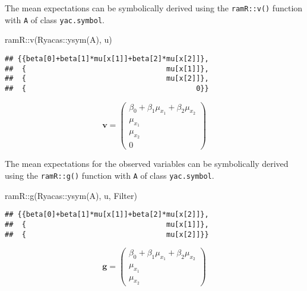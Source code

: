 \documentclass[
]{book}
\newenvironment{Shaded}{\begin{snugshade}}{\end{snugshade}}
\newcommand{\FunctionTok}[1]{\textcolor[rgb]{0.00,0.00,0.00}{#1}}
\newcommand{\NormalTok}[1]{#1}
\newcommand{\SpecialCharTok}[1]{\textcolor[rgb]{0.00,0.00,0.00}{#1}}
\theoremstyle{definition}
\theoremstyle{definition}
\theoremstyle{definition}
\theoremstyle{remark}
\begin{document}
The mean expectations
can be symbolically derived using the \texttt{ramR::v()} function
with \texttt{A} of class \texttt{yac.symbol}.

\begin{Shaded}
\begin{Highlighting}[]
\NormalTok{ramR}\SpecialCharTok{::}\FunctionTok{v}\NormalTok{(Ryacas}\SpecialCharTok{::}\FunctionTok{ysym}\NormalTok{(A), u)}
\end{Highlighting}
\end{Shaded}

\begin{verbatim}
## {{beta[0]+beta[1]*mu[x[1]]+beta[2]*mu[x[2]]},
##  {                                 mu[x[1]]},
##  {                                 mu[x[2]]},
##  {                                        0}}
\end{verbatim}

\begin{equation*}\mathbf{v} =\left( \begin{array}{c} \beta  _{0} + \beta  _{1} \mu  _{x _{1}} + \beta  _{2} \mu  _{x _{2}} \\ \mu  _{x _{1}} \\ \mu  _{x _{2}} \\ 0 \end{array} \right)\end{equation*}

The mean expectations for the observed variables
can be symbolically derived using the \texttt{ramR::g()} function
with \texttt{A} of class \texttt{yac.symbol}.

\begin{Shaded}
\begin{Highlighting}[]
\NormalTok{ramR}\SpecialCharTok{::}\FunctionTok{g}\NormalTok{(Ryacas}\SpecialCharTok{::}\FunctionTok{ysym}\NormalTok{(A), u, Filter)}
\end{Highlighting}
\end{Shaded}

\begin{verbatim}
## {{beta[0]+beta[1]*mu[x[1]]+beta[2]*mu[x[2]]},
##  {                                 mu[x[1]]},
##  {                                 mu[x[2]]}}
\end{verbatim}

\begin{equation*}\mathbf{g} =\left( \begin{array}{c} \beta  _{0} + \beta  _{1} \mu  _{x _{1}} + \beta  _{2} \mu  _{x _{2}} \\ \mu  _{x _{1}} \\ \mu  _{x _{2}} \end{array} \right)\end{equation*}
\end{document}
